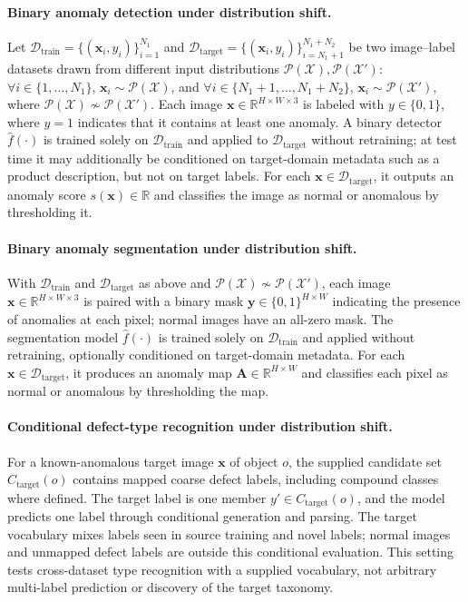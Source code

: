 \paragraph{Binary anomaly detection under distribution shift.}
Let $\mathcal{D}_{\text{train}}=\{(\boldsymbol{x}_i,y_i)\}_{i=1}^{N_1}$ and $\mathcal{D}_{\text{target}}=\{(\boldsymbol{x}_i,y_i)\}_{i=N_1+1}^{N_1+N_2}$ be two image--label datasets drawn from different input distributions $\mathcal{P}(\mathcal{X}),\mathcal{P}(\mathcal{X}')$: $\forall i\in\{1,\dots,N_1\}$, $\boldsymbol{x}_i\sim\mathcal{P}(\mathcal{X})$, and $\forall i\in\{N_1+1,\dots,N_1+N_2\}$, $\boldsymbol{x}_i\sim\mathcal{P}(\mathcal{X}')$, where $\mathcal{P}(\mathcal{X})\nsim\mathcal{P}(\mathcal{X}')$. Each image $\boldsymbol{x}\in\mathbb{R}^{H\times W\times 3}$ is labeled with $y\in\{0,1\}$, where $y=1$ indicates that it contains at least one anomaly. A binary detector $\hat{f}(\cdot)$ is trained solely on $\mathcal{D}_{\mathrm{train}}$ and applied to $\mathcal{D}_{\mathrm{target}}$ without retraining; at test time it may additionally be conditioned on target-domain metadata such as a product description, but not on target labels. For each $\boldsymbol{x}\in\mathcal{D}_{\mathrm{target}}$, it outputs an anomaly score $s(\boldsymbol{x})\in\mathbb{R}$ and classifies the image as normal or anomalous by thresholding it.

\paragraph{Binary anomaly segmentation under distribution shift.}
With $\mathcal{D}_{\text{train}}$ and $\mathcal{D}_{\text{target}}$ as above and $\mathcal{P}(\mathcal{X})\nsim\mathcal{P}(\mathcal{X}')$, each image $\boldsymbol{x}\in\mathbb{R}^{H\times W\times 3}$ is paired with a binary mask $\boldsymbol{y}\in\{0,1\}^{H\times W}$ indicating the presence of anomalies at each pixel; normal images have an all-zero mask. The segmentation model $\hat{f}(\cdot)$ is trained solely on $\mathcal{D}_{\mathrm{train}}$ and applied without retraining, optionally conditioned on target-domain metadata. For each $\boldsymbol{x}\in\mathcal{D}_{\mathrm{target}}$, it produces an anomaly map $\mathbf{A}\in\mathbb{R}^{H\times W}$ and classifies each pixel as normal or anomalous by thresholding the map.

\paragraph{Conditional defect-type recognition under distribution shift.}
For a known-anomalous target image $\boldsymbol{x}$ of object $o$, the supplied candidate set $C_{\mathrm{target}}(o)$ contains mapped coarse defect labels, including compound classes where defined. The target label is one member $y'\in C_{\mathrm{target}}(o)$, and the model predicts one label through conditional generation and parsing. The target vocabulary mixes labels seen in source training and novel labels; normal images and unmapped defect labels are outside this conditional evaluation. This setting tests cross-dataset type recognition with a supplied vocabulary, not arbitrary multi-label prediction or discovery of the target taxonomy.

